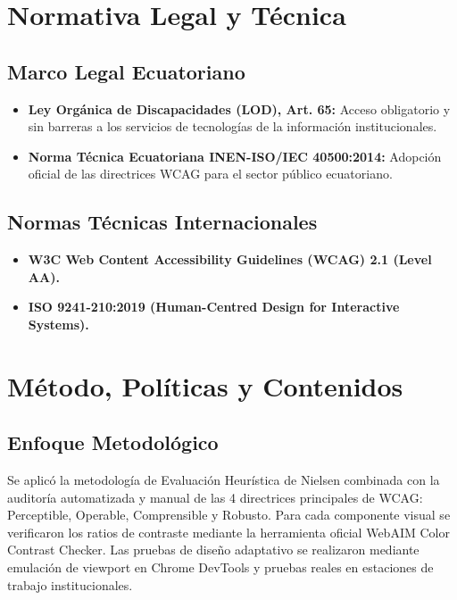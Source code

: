 \documentclass[12pt,a4paper]{article}
\begin{document}
\section{Normativa Legal y Técnica}
\subsection{Marco Legal Ecuatoriano}
\begin{itemize}[leftmargin=1.5em, itemsep=2pt]
    \item \textbf{Ley Orgánica de Discapacidades (LOD), Art. 65:} Acceso obligatorio y sin barreras a los servicios de tecnologías de la información institucionales.
    \item \textbf{Norma Técnica Ecuatoriana INEN-ISO/IEC 40500:2014:} Adopción oficial de las directrices WCAG para el sector público ecuatoriano.
\end{itemize}
\subsection{Normas Técnicas Internacionales}
\begin{itemize}[leftmargin=1.5em, itemsep=2pt]
    \item \textbf{W3C Web Content Accessibility Guidelines (WCAG) 2.1 (Level AA).}
    \item \textbf{ISO 9241-210:2019 (Human-Centred Design for Interactive Systems).}
\end{itemize}

\section{Método, Políticas y Contenidos}
\subsection{Enfoque Metodológico}
Se aplicó la metodología de Evaluación Heurística de Nielsen combinada con la auditoría automatizada y manual de las 4 directrices principales de WCAG: Perceptible, Operable, Comprensible y Robusto. Para cada componente visual se verificaron los ratios de contraste mediante la herramienta oficial WebAIM Color Contrast Checker. Las pruebas de diseño adaptativo se realizaron mediante emulación de viewport en Chrome DevTools y pruebas reales en estaciones de trabajo institucionales.
\end{document}
